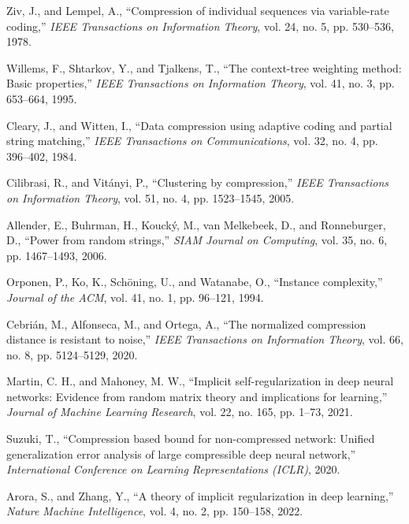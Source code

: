 \documentclass[12pt,a4paper]{report}
\begin{document}
\begin{thebibliography}{99}
Ziv, J., and Lempel, A., ``Compression of individual sequences via variable-rate coding,'' \textit{IEEE Transactions on Information Theory}, vol. 24, no. 5, pp. 530--536, 1978.

Willems, F., Shtarkov, Y., and Tjalkens, T., ``The context-tree weighting method: Basic properties,'' \textit{IEEE Transactions on Information Theory}, vol. 41, no. 3, pp. 653--664, 1995.

Cleary, J., and Witten, I., ``Data compression using adaptive coding and partial string matching,'' \textit{IEEE Transactions on Communications}, vol. 32, no. 4, pp. 396--402, 1984.

Cilibrasi, R., and Vitányi, P., ``Clustering by compression,'' \textit{IEEE Transactions on Information Theory}, vol. 51, no. 4, pp. 1523--1545, 2005.

Allender, E., Buhrman, H., Koucký, M., van Melkebeek, D., and Ronneburger, D., ``Power from random strings,'' \textit{SIAM Journal on Computing}, vol. 35, no. 6, pp. 1467--1493, 2006.

Orponen, P., Ko, K., Schöning, U., and Watanabe, O., ``Instance complexity,'' \textit{Journal of the ACM}, vol. 41, no. 1, pp. 96--121, 1994.

Cebrián, M., Alfonseca, M., and Ortega, A., ``The normalized compression distance is resistant to noise,'' \textit{IEEE Transactions on Information Theory}, vol. 66, no. 8, pp. 5124--5129, 2020.

Martin, C. H., and Mahoney, M. W., ``Implicit self-regularization in deep neural networks: Evidence from random matrix theory and implications for learning,'' \textit{Journal of Machine Learning Research}, vol. 22, no. 165, pp. 1--73, 2021.

Suzuki, T., ``Compression based bound for non-compressed network: Unified generalization error analysis of large compressible deep neural network,'' \textit{International Conference on Learning Representations (ICLR)}, 2020.

Arora, S., and Zhang, Y., ``A theory of implicit regularization in deep learning,'' \textit{Nature Machine Intelligence}, vol. 4, no. 2, pp. 150--158, 2022.


\end{thebibliography}
\end{document}
